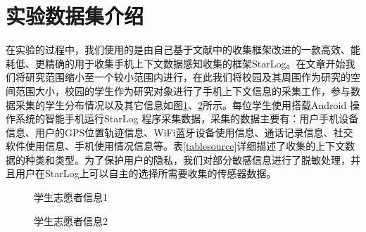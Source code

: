 \section{实验数据集介绍}
\label{sec:section5-1}
在实验的过程中，我们使用的是由自己基于文献\cite{rawassizadeh2013ubiqlog}中的收集框架改进的一款高效、能耗低、更精确的用于收集手机上下文数据感知收集的框架StarLog。在文章开始我们将研究范围缩小至一个较小范围内进行，在此我们将校园及其周围作为研究的空间范围大小，校园的学生作为研究对象进行了手机上下文信息的采集工作，参与数据采集的学生分布情况以及其它信息如图\ref{fig:stu_info1}、\ref{fig:stu_info2}所示。每位学生使用搭载Android 操作系统的智能手机运行StarLog 程序采集数据，采集的数据主要有：用户手机设备信息、用户的GPS位置轨迹信息、WiFi蓝牙设备使用信息、通话记录信息、社交软件使用信息、手机使用情况信息等。表\ref{tablesource}详细描述了收集的上下文数据的种类和类型。为了保护用户的隐私，我们对部分敏感信息进行了脱敏处理，并且用户在StarLog上可以自主的选择所需要收集的传感器数据。
\begin{figure}[htb]
  \centering%
  \hspace{4em}%
  \caption{学生志愿者信息1}
  \label{fig:stu_info1}
\end{figure}

\begin{figure}[htb]
  \centering%
  \hspace{4em}%
  \caption{学生志愿者信息2}
  \label{fig:stu_info2}
\end{figure}


